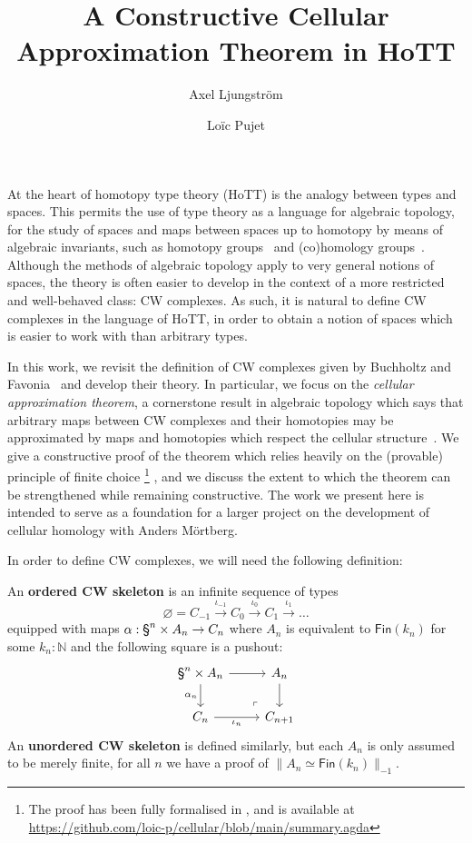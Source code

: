 \documentclass{easychair}
\title{A Constructive Cellular Approximation Theorem in HoTT}
\author{
Axel Ljungström \and Loïc Pujet}
\institute{
  {
  Stockholm University,
  Stockholm, Sweden
  }
 }
\begin{document}
\maketitle

At the heart of homotopy type theory (HoTT) is the analogy between types and spaces.
%
This permits the use of type theory as a language for algebraic topology, \ie for the study
of spaces and maps between spaces up to homotopy by means of algebraic invariants, such as homotopy groups~\cite{HoTT13,Brunerie16,Buchholtz2016TheCC} and (co)homology groups~\cite{LicataFinster14,CavalloMsc15,BuchholtzFavonia18,graham18,BLM22,christensen2020hurewicz,LLM23,LM24}.
%
Although the methods of algebraic topology apply to very general notions of spaces, the theory is
often easier to develop in the context of a more restricted and well-behaved class:
CW complexes.
%
As such, it is natural to define CW complexes in the language of HoTT,
in order to obtain a notion of spaces which is easier to work with than arbitrary types.

In this work, we revisit the definition of CW complexes given by Buchholtz and
Favonia~\cite{BuchholtzFavonia18} and develop their theory.
%
In particular, we focus on the \emph{cellular approximation theorem}, a cornerstone result in
algebraic topology which says that arbitrary maps between CW complexes and their homotopies may be
approximated by maps and homotopies which respect the cellular structure~\cite[chap. 10]{May1999}.
%
We give a constructive proof of the theorem which relies heavily on the (provable) principle of
finite choice%
\footnote{The proof has been fully formalised in \CubicalAgda, and is available at \url{https://github.com/loic-p/cellular/blob/main/summary.agda}}%
, and we discuss the extent to which the theorem can be strengthened while remaining constructive.
%
The work we present here is intended to serve as a foundation for a larger
project on the development of cellular homology with Anders Mörtberg.

In order to define CW complexes, we will need the following definition:

\begin{definition}[CW skeleta]
  An \textbf{ordered CW skeleton} is an infinite sequence of types $$\varnothing = C_{-1} \xrightarrow{\iota_{-1}} C_0 \xrightarrow{\iota_{0}} C_1 \xrightarrow{\iota_{1}} \dots$$
  equipped with maps $\alpha : \sphere{n} \times A_n \to C_n$ where $A_n$ is equivalent to $\mathsf{Fin}(k_n)$ for some $k_n : \mathbb{N}$ and the following square is a pushout:
  \[
\begin{tikzcd}[ampersand replacement=\&]
	{\sphere{n} \times A_n} \& {A_n} \\
	{C_n} \& {C_{n+1}}
	\arrow[from=1-1, to=1-2]
	\arrow["{\alpha_n}"', from=1-1, to=2-1]
	\arrow["{\iota_n}"', from=2-1, to=2-2]
	\arrow[from=1-2, to=2-2]
	\arrow["\lrcorner"{anchor=center, pos=0.125, rotate=180}, draw=none, from=2-2, to=1-1]
\end{tikzcd}
\]
An \textbf{unordered CW skeleton} is defined similarly, but each $A_n$ is only assumed to be merely
finite, \ie for all \( n \) we have a proof of \( \| A_n \simeq \mathsf{Fin}(k_n) \|_{-1} \).
\end{definition}
\end{document}
